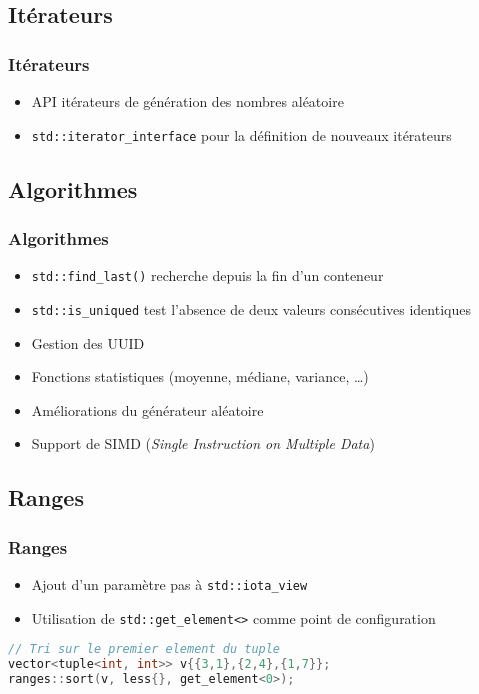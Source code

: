 \documentclass[C++.tex]{subfiles}
\begin{document}
\subsection*{Itérateurs}
\begin{frame}[fragile]
	\frametitle{Itérateurs}
	\begin{itemize}
		\item API \og itérateurs\fg{} de génération des nombres aléatoire
		\item \lstinline|std::iterator_interface| pour la définition de nouveaux itérateurs
	\end{itemize}
\end{frame}

\subsection*{Algorithmes}
\begin{frame}[fragile]
	\frametitle{Algorithmes}
	\begin{itemize}
		\item \lstinline|std::find_last()| recherche depuis la fin d'un conteneur
		\item \lstinline|std::is_uniqued| test l'absence de deux valeurs consécutives identiques
		\item Gestion des UUID
		\item Fonctions statistiques (moyenne, médiane, variance, \ldots{})
		\item Améliorations du générateur aléatoire
		\item Support de SIMD (\textit{Single Instruction on Multiple Data})
	\end{itemize}
\end{frame}

\subsection*{Ranges}
\begin{frame}[fragile]
	\frametitle{Ranges}
	\begin{itemize}
		\item Ajout d'un paramètre \og pas\fg{} à \lstinline|std::iota_view|
		\item Utilisation de \lstinline|std::get_element<>| comme point de configuration
	\end{itemize}

	\begin{lstlisting}[language=C++]
// Tri sur le premier element du tuple
vector<tuple<int, int>> v{{3,1},{2,4},{1,7}};
ranges::sort(v, less{}, get_element<0>);\end{lstlisting}

\end{frame}
\end{document}
